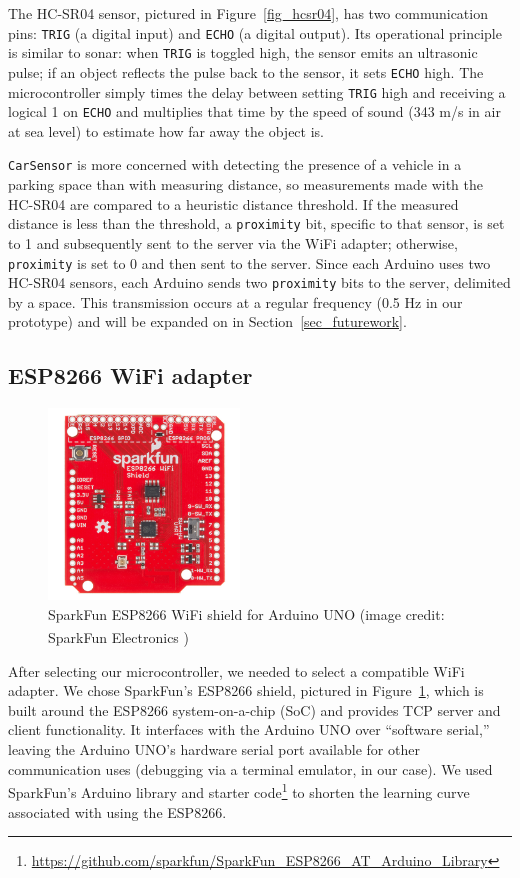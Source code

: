 \documentclass[conference]{IEEEtran}
\begin{document}
The HC-SR04 sensor, pictured in Figure~\ref{fig_hcsr04}, has two communication pins: \texttt{TRIG} (a digital input) and \texttt{ECHO} (a digital output). Its operational principle is similar to sonar: when \texttt{TRIG} is toggled high, the sensor emits an ultrasonic pulse; if an object reflects the pulse back to the sensor, it sets \texttt{ECHO} high. The microcontroller simply times the delay between setting \texttt{TRIG} high and receiving a logical 1 on \texttt{ECHO} and multiplies that time by the speed of sound (343 m/s in air at sea level) to estimate how far away the object is.

\texttt{CarSensor} is more concerned with detecting the presence of a vehicle in a parking space than with measuring distance, so measurements made with the HC-SR04 are compared to a heuristic distance threshold. If the measured distance is less than the threshold, a \texttt{proximity} bit, specific to that sensor, is set to 1 and subsequently sent to the server via the WiFi adapter; otherwise, \texttt{proximity} is set to 0 and then sent to the server. Since each Arduino uses two HC-SR04 sensors, each Arduino sends two \texttt{proximity} bits to the server, delimited by a space. This transmission occurs at a regular frequency (0.5 Hz in our prototype) and will be expanded on in Section~\ref{sec_futurework}.

\subsection{ESP8266 WiFi adapter}

\begin{figure}[h]
	\centering
	\includegraphics[width=2.0in]{esp8266.jpg}
	\caption{SparkFun ESP8266 WiFi shield for Arduino UNO (image credit: SparkFun Electronics \textsuperscript{\textregistered})}
	\label{fig_esp8266}
\end{figure}

After selecting our microcontroller, we needed to select a compatible WiFi adapter. We chose SparkFun's ESP8266 shield, pictured in Figure~\ref{fig_esp8266}, which is built around the ESP8266 system-on-a-chip (SoC) and provides TCP server and client functionality. It interfaces with the Arduino UNO over ``software serial,'' leaving the Arduino UNO's hardware serial port available for other communication uses (debugging via a terminal emulator, in our case). We used SparkFun's Arduino library and starter code\footnote{\url{https://github.com/sparkfun/SparkFun_ESP8266_AT_Arduino_Library}} to shorten the learning curve associated with using the ESP8266.
\end{document}
